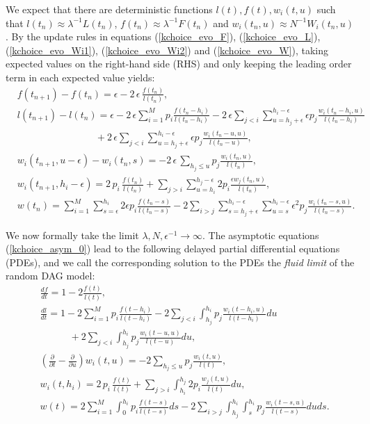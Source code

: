 \documentclass[12pt]{article}
\numberwithin{equation}{section}  %
\begin{document}
We expect that there are deterministic functions $l(t),f(t),w_i(t,u)$ such that $l(t_n)\approx \lambda^{-1}  L(t_n)$, $f(t_n) \approx \lambda^{-1}  F(t_n)$ and $w_i(t_n, u) \approx N^{-1}  W_i(t_n, u)$. By the update rules in equations (\ref{kchoice_evo_F}), (\ref{kchoice_evo_L}), (\ref{kchoice_evo_Wi1}), (\ref{kchoice_evo_Wi2}) and (\ref{kchoice_evo_W}), taking expected values on the right-hand side (RHS) and only keeping the leading order term in each expected value yields:
\begin{align}
&f(t_{n+1}) - f(t_n) = \epsilon - 2 \, \epsilon \, \frac{f(t_n)}{l(t_n)} \nonumber,\\
&l(t_{n+1}) - l(t_n) = \epsilon - 2 \, \epsilon \sum_{i=1}^M p_i\frac{f(t_n-h_i)}{l(t_n-h_i)}  - 2 \, \epsilon \sum_{j<i}\sum_{u=h_j+\epsilon}^{h_i-\epsilon}\epsilon p_j\frac{w_i(t_n-h_i,u)}{l(t_n-h_i)} \nonumber \\
&\quad\quad\quad\quad\quad\quad\quad\quad + 2 \, \epsilon \sum_{j<i}\sum_{u=h_j+\epsilon}^{h_i-\epsilon} \epsilon p_j\frac{w_i(t_n-u,u)}{l(t_n-u)}\nonumber,\\
&w_i(t_{n+1}, u-\epsilon) - w_i(t_n, s) = - 2 \, \epsilon \,\sum_{h_j\leq u} p_j\frac{w_i(t_n,u)}{l(t_n)}  \nonumber,\\
&w_i(t_{n+1},h_i-\epsilon) = 2 \, p_i \, \frac{f(t_n)}{l(t_n)}+\sum_{j>i}\sum_{u= h_i}^{h_j-\epsilon}2p_i\frac{\epsilon w_j(t_n,u)}{l(t_n)}\nonumber,\\
&w(t_n) =\sum_{i=1}^{M}\sum_{s=\epsilon}^{h_i}2\epsilon p_i\frac{f(t_n-s)}{l(t_n-s)}-2\sum_{i>j}\sum_{s=h_j+\epsilon}^{h_i-\epsilon}\sum_{u=s}^{h_i-\epsilon} \epsilon^2p_j\frac{w_i(t_n-s,u)}{l(t_n-s)}.\label{kchoice_asym_0}
\end{align}

We now formally take the limit $\lambda, N, \epsilon^{-1} \rightarrow \infty$. The asymptotic equations (\ref{kchoice_asym_0}) lead to the following delayed partial differential equations (PDEs), and we call the corresponding solution to the PDEs the \textit{fluid limit} of the random DAG model:
\begin{align} 
&\frac{df}{dt}=1-2\frac{f(t)}{l(t)},\label{k_fl_f}\\
&\frac{dl}{dt}=1-2\sum_{i=1}^M p_i\frac{f(t-h_i)}{l(t-h_i)}-2\sum_{j<i}\int_{h_j}^{h_i}p_j\frac{w_i(t-h_i,u)}{l(t-h_i)}du\nonumber\\
&\quad\quad\quad+2\sum_{j<i}\int_{h_j}^{h_i}p_j\frac{w_i(t-u,u)}{l(t-u)}du,\label{k_fl_l}\\
&\left(\frac{\partial}{\partial t}-\frac{\partial}{\partial u}\right)w_i(t,u)=-2\sum_{h_j\leq u} p_j\frac{w_i(t,u)}{l(t)},\label{k_fl_wi1}\\
&w_i(t,h_i)=2 \, p_i \, \frac{f(t)}{l(t)}+\sum_{j>i}\int_{ h_i}^{h_j}2p_i\frac{w_j(t,u)}{l(t)}du, \label{k_fl_wi2}\\
&w(t) = 2\sum_{i=1}^{M}\int_{0}^{h_i} p_i\frac{f(t-s)}{l(t-s)}ds-2\sum_{i>j}\int_{h_j}^{h_i}\int_{s}^{h_i} p_j\frac{w_i(t-s,u)}{l(t-s)}duds.\label{k_fl_w}
\end{align}
\end{document}
